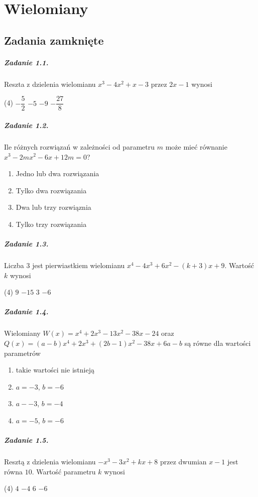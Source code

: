 \chapter{Wielomiany}

\section{Zadania zamknięte}

\paragraph{Zadanie 1.1.} Reszta z dzielenia wielomianu $x^3 - 4x^2 + x -3$ przez $2x - 1$ wynosi
\begin{tasks}(4)
	\task $-\dfrac{5}{2}$
	\task $-5$
	\task $-9$
	\task $-\dfrac{27}{8}$ %
\end{tasks}

\paragraph{Zadanie 1.2.} Ile różnych rozwiązań w zależności od parametru $m$ może mieć równanie $x^3 - 2mx^2 - 6x + 12m = 0$?
\begin{enumerate}[label=\alph*)]
	\item Jedno lub dwa rozwiązania
	\item Tylko dwa rozwiązania
	\item Dwa lub trzy rozwiąznia %
	\item Tylko trzy rozwiązania
\end{enumerate}

\paragraph{Zadanie 1.3.} Liczba $3$ jest pierwiastkiem wielomianu ${x^4 - 4x^3 + 6x^2 - (k + 3)x + 9}$. Wartość $k$ wynosi
\begin{tasks}(4)
	\task $9$ %
	\task $-15$
	\task $3$
	\task $-6$
\end{tasks}

\newpage

\paragraph{Zadanie 1.4.} Wielomiany $W(x) = x^4 + 2x^3 - 13x^2 - 38x - 24$ oraz\\ ${Q(x) = (a - b)x^4 + 2x^3 +(2b - 1)x^2 -38x +6a - b}$ są równe dla wartości parametrów
\begin{enumerate}[label=\alph*)]
	\item takie wartości nie istnieją
	\item $a = -3$, $b = -6$
	\item $a - -3$, $b = -4$
	\item $a = -5$, $b = -6$ %
\end{enumerate}

\paragraph{Zadanie 1.5.} Resztą z dzielenia wielomianu $-x^3 - 3x^2 + kx +8$ przez dwumian $x - 1$ jest równa $10$. Wartość parametru $k$ wynosi
\begin{tasks}(4)
	\task $4$
	\task $-4$
	\task $6$ %
	\task $-6$
\end{tasks}